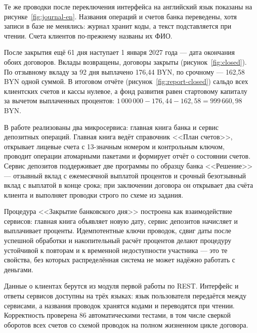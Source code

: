 \documentclass[14pt,a4paper]{extarticle}
\begin{document}
Те же проводки после переключения интерфейса на английский язык показаны на
рисунке~\ref{fig:journal-en}. Названия операций и счетов банка переведены, хотя записи в
базе не менялись: журнал хранит коды, а текст подставляется при чтении. Счета клиентов
по-прежнему названы их ФИО.


После закрытия ещё 61 дня наступает 1 января 2027 года --- дата окончания обоих
договоров. Вклады возвращены, договоры закрыты (рисунок~\ref{fig:closed}). По отзывному
вкладу за 92 дня выплачено 176,44 BYN, по срочному --- 162,58 BYN одной суммой. В итоговом
отчёте (рисунок~\ref{fig:report-closed}) сальдо всех клиентских счетов и кассы нулевое, а
фонд развития равен стартовому капиталу за вычетом выплаченных процентов:
$1\,000\,000 - 176{,}44 - 162{,}58 = 999\,660{,}98$ BYN.




В работе реализованы два микросервиса: главная книга банка и сервис депозитных операций.
Главная книга ведёт справочник <<План счетов>>, открывает лицевые счета с 13-значным
номером и контрольным ключом, проводит операции атомарными пакетами и формирует отчёт о
состоянии счетов. Сервис депозитов поддерживает две программы по образцу банка <<Решение>> ---
отзывный вклад с ежемесячной выплатой процентов и срочный безотзывный вклад с выплатой
в конце срока; при заключении договора он открывает два счёта клиента и выполняет проводки
строго по схеме из задания.

Процедура <<Закрытие банковского дня>> построена как взаимодействие сервисов: главная
книга объявляет новую дату, сервис депозитов начисляет и выплачивает проценты. Идемпотентные
ключи проводок, сдвиг даты после успешной обработки и накопительный расчёт процентов делают
процедуру устойчивой к повторам и к временной недоступности участника --- это те свойства,
без которых распределённая система не может надёжно работать с деньгами.

Данные о клиентах берутся из модуля первой работы по REST. Интерфейс и ответы сервисов
доступны на трёх языках: язык пользователя передаётся между сервисами, а названия проводок
хранятся кодами и переводятся при чтении. Корректность проверена 86 автоматическими тестами, в том числе сверкой оборотов всех счетов со схемой проводок на
полном жизненном цикле договора.
\end{document}
